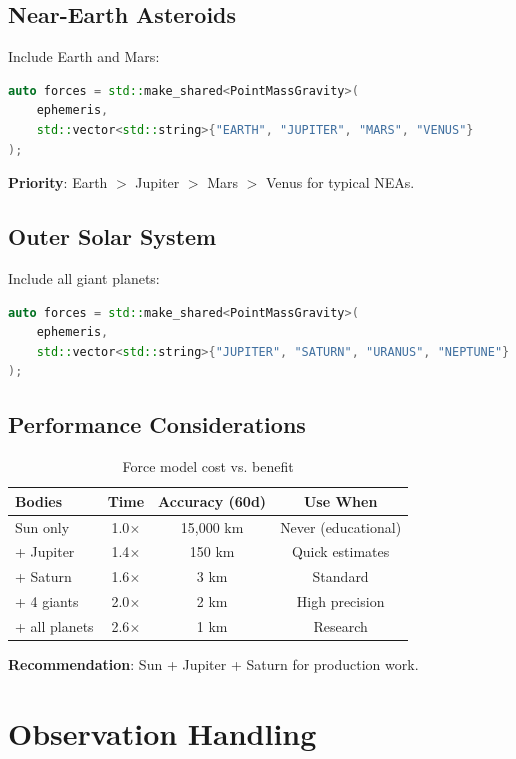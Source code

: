 \subsection{Near-Earth Asteroids}

Include Earth and Mars:

\begin{lstlisting}[language=C++]
auto forces = std::make_shared<PointMassGravity>(
    ephemeris,
    std::vector<std::string>{"EARTH", "JUPITER", "MARS", "VENUS"}
);
\end{lstlisting}

\textbf{Priority}: Earth $>$ Jupiter $>$ Mars $>$ Venus for typical NEAs.

\subsection{Outer Solar System}

Include all giant planets:

\begin{lstlisting}[language=C++]
auto forces = std::make_shared<PointMassGravity>(
    ephemeris,
    std::vector<std::string>{"JUPITER", "SATURN", "URANUS", "NEPTUNE"}
);
\end{lstlisting}

\subsection{Performance Considerations}

\begin{table}[h]
\centering
\caption{Force model cost vs. benefit}
\begin{tabular}{lccc}
\hline
\textbf{Bodies} & \textbf{Time} & \textbf{Accuracy (60d)} & \textbf{Use When} \\
\hline
Sun only & 1.0$\times$ & 15,000 km & Never (educational) \\
+ Jupiter & 1.4$\times$ & 150 km & Quick estimates \\
+ Saturn & 1.6$\times$ & 3 km & Standard \\
+ 4 giants & 2.0$\times$ & 2 km & High precision \\
+ all planets & 2.6$\times$ & 1 km & Research \\
\hline
\end{tabular}
\end{table}

\textbf{Recommendation}: Sun + Jupiter + Saturn for production work.

\section{Observation Handling}

